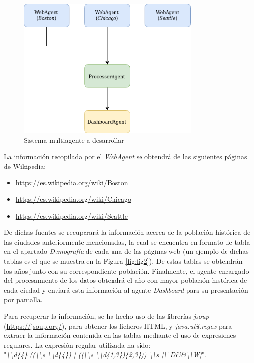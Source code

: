 \documentclass{estilo}
\begin{document}
    \vfill
    \begin{figure} [ht]
        \centering
        \includegraphics[width=9cm]{diagrama-agentes.png}
        \caption{Sistema multiagente a desarrollar}
        \label{fig:fig1}
    \end{figure}
    \vfill

    La información recopilada por el \textit{WebAgent} se obtendrá de las siguientes páginas de Wikipedia:

    \begin{itemize}
        \item \url{https://es.wikipedia.org/wiki/Boston}
        \item \url{https://es.wikipedia.org/wiki/Chicago}
        \item \url{https://es.wikipedia.org/wiki/Seattle}
    \end{itemize}

    \bigskip
    De dichas fuentes se recuperará la información acerca de la población histórica de las ciudades anteriormente mencionadas, la cual se encuentra en formato de tabla en el apartado \textit{Demografía} de cada una de las páginas web (un ejemplo de dichas tablas es el que se muestra en la Figura \ref{fig:fig2}). De estas tablas se obtendrán los años junto con su correspondiente población. Finalmente, el agente encargado del procesamiento de los datos obtendrá el año con mayor población histórica de cada ciudad y enviará esta información al agente \textit{Dashboard} para su presentación por pantalla.
    
    Para recuperar la información, se ha hecho uso de las librerías \textit{jsoup} (\url{https://jsoup.org/}), para obtener los ficheros HTML, y \textit{java.util.regex} para extraer la información contenida en las tablas mediante el uso de expresiones regulares. La expresión regular utilizada ha sido: \\ "\textit{\textbackslash \textbackslash d\{4\} ((\textbackslash \textbackslash s \textbackslash \textbackslash d\{4\}) | ((\textbackslash \textbackslash s \textbackslash \textbackslash d\{1,3\})\{2,3\})) \textbackslash \textbackslash s [\textbackslash \textbackslash D\&\&\textbackslash \textbackslash W]}".
    
\end{document}
